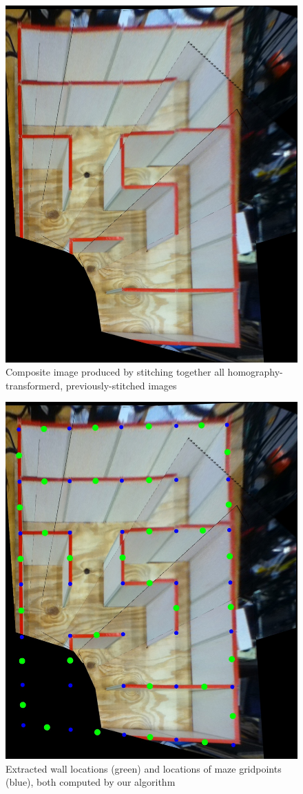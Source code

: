 \documentclass[10pt,twocolumn,letterpaper]{article}
\begin{document}
\begin{figure}[h!]
\begin{center}
		\includegraphics[width=0.8\linewidth]{images/final.jpg}
\end{center}
\caption{Composite image produced by stitching together all homography-transformerd, previously-stitched images}
\label{fig:final}
\end{figure}

\begin{figure}[h!]
\begin{center}
		\includegraphics[width=0.8\linewidth]{images/Walls.jpg}
\end{center}
\caption{Extracted wall locations (green) and locations of maze gridpoints (blue), both computed by our algorithm}
\label{fig:walls}
\end{figure}
\end{document}
